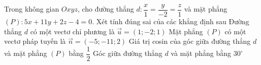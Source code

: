 \begin{ex}%
	Trong không gian $Oxyz$, cho đường thẳng $d\colon\dfrac{x}{1}=\dfrac{y}{-2}=\dfrac{z}{1}$ và mặt phẳng $\left( P \right)\colon5x+11y+2z-4=0$. Xét tính đúng sai của các khẳng định sau
	\choiceTF
	{\True Đường thẳng $d$ có một vectơ chỉ phương là $\overrightarrow{u}=\left( 1; -2; 1 \right)$}
	{Mặt phẳng $\left( P \right)$ có một vectơ pháp tuyến là $\overrightarrow{n}=\left( -5; -11; 2 \right)$}
	{Giá trị cosin của góc giữa đường thẳng $d$ và mặt phẳng $\left( P \right)$ bằng $\dfrac{1}{2}$}
	{\True Góc giữa đường thẳng $d$ và mặt phẳng bằng $30^\circ $}
\end{ex}

